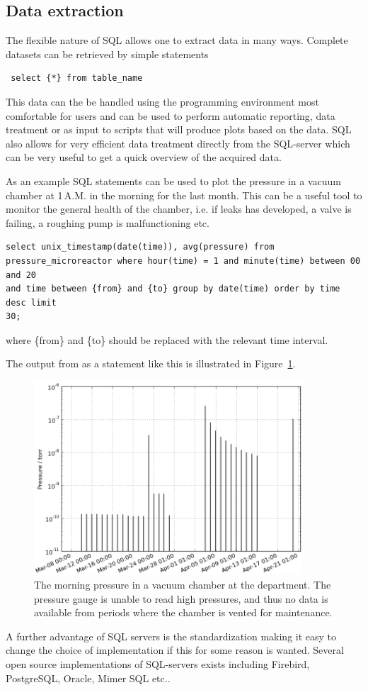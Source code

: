 \subsection{Data extraction} 
The flexible nature of SQL allows one to extract data in many
ways. Complete datasets can be retrieved by simple statements 

\begin{verbatim}
 select {*} from table_name
\end{verbatim}

This data can the be handled using the programming environment most comfortable
for users and can be used to perform automatic reporting, data treatment or as
input to scripts that will produce plots based on the data. SQL also allows for
very efficient data treatment directly from the SQL-server which can be very
useful to get a quick overview of the acquired data. 

As an example SQL statements can be used to plot the pressure in a vacuum
chamber at 1\,A.M. in the morning for the last month. This can be a useful tool
to monitor the general health of the chamber, i.e. if leaks has developed, a
valve is failing, a roughing pump is malfunctioning etc.

\begin{verbatim} 
select unix_timestamp(date(time)), avg(pressure) from
pressure_microreactor where hour(time) = 1 and minute(time) between 00 and 20
and time between {from} and {to} group by date(time) order by time desc limit
30; 
\end{verbatim}
where \{from\}  and \{to\} should be replaced with the
relevant time interval.

The output from as a statement like this is illustrated in
Figure~\ref{fig:morning_pressure}.
\begin{figure}
 \begin{center}
 \includegraphics[width=10cm]{morning_pressure.png}
 \caption{ The morning pressure in a vacuum chamber at the department. The
   pressure gauge is unable to read high pressures, and thus no data is
   available from periods where the chamber is vented for maintenance.
   \label{fig:morning_pressure}
 } 
 \end{center}
\end{figure}

A further advantage of SQL servers is the standardization making it easy to
change the choice of implementation if this for some reason is wanted. Several
open source implementations of SQL-servers exists including Firebird,
PostgreSQL, Oracle, Mimer SQL etc..



